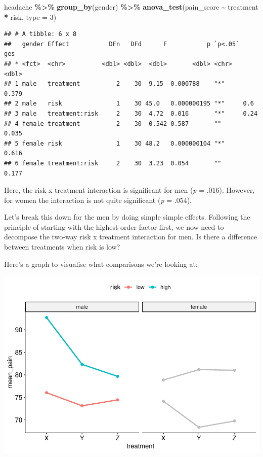 \documentclass[
]{book}
\newenvironment{Shaded}{\begin{snugshade}}{\end{snugshade}}
\newcommand{\AttributeTok}[1]{\textcolor[rgb]{0.13,0.29,0.53}{#1}}
\newcommand{\DecValTok}[1]{\textcolor[rgb]{0.00,0.00,0.81}{#1}}
\newcommand{\FunctionTok}[1]{\textcolor[rgb]{0.13,0.29,0.53}{\textbf{#1}}}
\newcommand{\NormalTok}[1]{#1}
\newcommand{\SpecialCharTok}[1]{\textcolor[rgb]{0.81,0.36,0.00}{\textbf{#1}}}
\begin{document}
\begin{Shaded}
\begin{Highlighting}[]
\NormalTok{headache }\SpecialCharTok{\%\textgreater{}\%}
  \FunctionTok{group\_by}\NormalTok{(gender) }\SpecialCharTok{\%\textgreater{}\%}
  \FunctionTok{anova\_test}\NormalTok{(pain\_score }\SpecialCharTok{\textasciitilde{}}\NormalTok{ treatment }\SpecialCharTok{*}\NormalTok{ risk, }\AttributeTok{type =} \DecValTok{3}\NormalTok{)}
\end{Highlighting}
\end{Shaded}

\begin{verbatim}
## # A tibble: 6 x 8
##   gender Effect           DFn   DFd      F           p `p<.05`   ges
## * <fct>  <chr>          <dbl> <dbl>  <dbl>       <dbl> <chr>   <dbl>
## 1 male   treatment          2    30  9.15  0.000788    "*"     0.379
## 2 male   risk               1    30 45.0   0.000000195 "*"     0.6  
## 3 male   treatment:risk     2    30  4.72  0.016       "*"     0.24 
## 4 female treatment          2    30  0.542 0.587       ""      0.035
## 5 female risk               1    30 48.2   0.000000104 "*"     0.616
## 6 female treatment:risk     2    30  3.23  0.054       ""      0.177
\end{verbatim}

Here, the risk x treatment interaction is significant for men (\emph{p} = .016). However, for women the interaction is not quite significant (\emph{p} = .054).

Let's break this down for the men by doing simple simple effects. Following the principle of starting with the highest-order factor first, we now need to decompose the two-way risk x treatment interaction for men. Is there a difference between treatments when risk is low?

Here's a graph to visualise what comparisons we're looking at:

\includegraphics{_main_files/figure-latex/unnamed-chunk-257-1.pdf}
\end{document}
